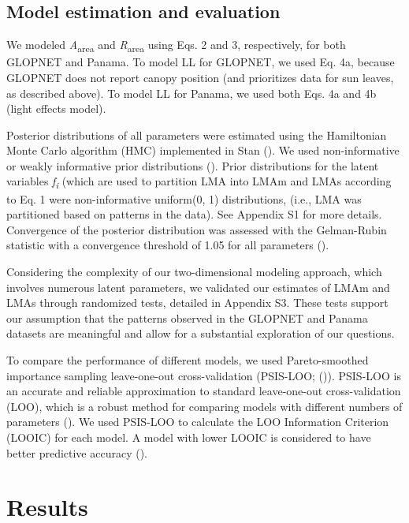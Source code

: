 \documentclass[
  12pt,
  letterpaper,
  DIV=11,
  numbers=noendperiod]{scrartcl}
\begin{document}
\subsection{Model estimation and
evaluation}\label{model-estimation-and-evaluation}

We modeled \emph{A}\textsubscript{area} and \emph{R}\textsubscript{area}
using Eqs. 2 and 3, respectively, for both GLOPNET and Panama. To model
LL for GLOPNET, we used Eq. 4a, because GLOPNET does not report canopy
position (and prioritizes data for sun leaves, as described above). To
model LL for Panama, we used both Eqs. 4a and 4b (light effects model).

Posterior distributions of all parameters were estimated using the
Hamiltonian Monte Carlo algorithm (HMC) implemented in Stan
(). We used
non-informative or weakly informative prior distributions
(). Prior distributions for the
latent variables \emph{f\textsubscript{i}} (which are used to partition
LMA into LMAm and LMAs according to Eq. 1 were non-informative
uniform(0, 1) distributions, (i.e., LMA was partitioned based on
patterns in the data). See Appendix S1 for more details. Convergence of
the posterior distribution was assessed with the Gelman-Rubin statistic
with a convergence threshold of 1.05 for all parameters
().

Considering the complexity of our two-dimensional modeling approach,
which involves numerous latent parameters, we validated our estimates of
LMAm and LMAs through randomized tests, detailed in Appendix S3. These
tests support our assumption that the patterns observed in the GLOPNET
and Panama datasets are meaningful and allow for a substantial
exploration of our questions.

To compare the performance of different models, we used Pareto-smoothed
importance sampling leave-one-out cross-validation (PSIS-LOO;
()). PSIS-LOO is an
accurate and reliable approximation to standard leave-one-out
cross-validation (LOO), which is a robust method for comparing models
with different numbers of parameters (). We used PSIS-LOO to calculate the LOO Information
Criterion (LOOIC) for each model. A model with lower LOOIC is considered
to have better predictive accuracy ().

\section{Results}\label{results}
\end{document}
